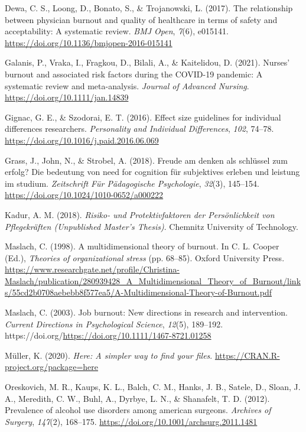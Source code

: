 \documentclass[
  man]{apa6}
\newlength{\cslhangindent}
\newenvironment{CSLReferences}[2] %
 {\begin{list}{}{%
  \setlength{\itemindent}{0pt}
  \setlength{\leftmargin}{0pt}
  \setlength{\parsep}{0pt}
  \ifodd #1
   \setlength{\leftmargin}{\cslhangindent}
   \setlength{\itemindent}{-1\cslhangindent}
  \fi
  \setlength{\itemsep}{#2\baselineskip}}}
 {\end{list}}
\begin{document}
\begin{CSLReferences}{1}{0}
Dewa, C. S., Loong, D., Bonato, S., \& Trojanowski, L. (2017). The relationship between physician burnout and quality of healthcare in terms of safety and acceptability: A systematic review. \emph{BMJ Open}, \emph{7}(6), e015141. \url{https://doi.org/10.1136/bmjopen-2016-015141}

Galanis, P., Vraka, I., Fragkou, D., Bilali, A., \& Kaitelidou, D. (2021). Nurses' burnout and associated risk factors during the COVID-19 pandemic: A systematic review and meta-analysis. \emph{Journal of Advanced Nursing}. \url{https://doi.org/10.1111/jan.14839}

Gignac, G. E., \& Szodorai, E. T. (2016). Effect size guidelines for individual differences researchers. \emph{Personality and Individual Differences}, \emph{102}, 74--78. \url{https://doi.org/10.1016/j.paid.2016.06.069}

Grass, J., John, N., \& Strobel, A. (2018). Freude am denken als schlüssel zum erfolg? Die bedeutung von need for cognition für subjektives erleben und leistung im studium. \emph{Zeitschrift Für Pädagogische Psychologie}, \emph{32}(3), 145--154. \url{https://doi.org/10.1024/1010-0652/a000222}

Kadur, A. M. (2018). \emph{{Risiko}- und {Protektivfaktoren} der {Persönlichkeit} von {Pflegekräften} ({Unpublished Master's Thesis})}. Chemnitz University of Technology.

Maslach, C. (1998). A multidimensional theory of burnout. In C. L. Cooper (Ed.), \emph{Theories of organizational stress} (pp. 68--85). Oxford University Press. \url{https://www.researchgate.net/profile/Christina-Maslach/publication/280939428_A_Multidimensional_Theory_of_Burnout/links/55cd2b0708aebebb8f577ea5/A-Multidimensional-Theory-of-Burnout.pdf}

Maslach, C. (2003). Job burnout: New directions in research and intervention. \emph{Current Directions in Psychological Science}, \emph{12}(5), 189--192. https://doi.org/\url{https://doi.org/10.1111/1467-8721.01258}

Müller, K. (2020). \emph{Here: A simpler way to find your files}. \url{https://CRAN.R-project.org/package=here}

Oreskovich, M. R., Kaups, K. L., Balch, C. M., Hanks, J. B., Satele, D., Sloan, J. A., Meredith, C. W., Buhl, A., Dyrbye, L. N., \& Shanafelt, T. D. (2012). Prevalence of alcohol use disorders among american surgeons. \emph{Archives of Surgery}, \emph{147}(2), 168--175. \url{https://doi.org/10.1001/archsurg.2011.1481}


\end{CSLReferences}
\end{document}

